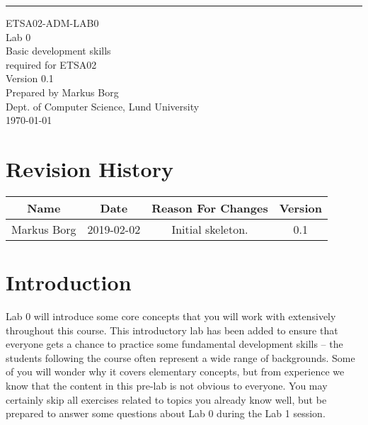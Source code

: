 \documentclass{scrreprt}
\date{}
\def\myversion{0.1 }
\begin{document}
\begin{flushright}
    \rule{16cm}{5pt}\vskip1cm
    \begin{bfseries}
    	\LARGE{ETSA02-ADM-LAB0}\\
    	\vspace{1.5cm}
        \Huge{Lab 0}\\
        \vspace{0.5cm}
        Basic development skills\\
        \vspace{0.5cm}
        required for ETSA02\\
        \vspace{1.5cm}
        \LARGE{Version \myversion}\\
        \vspace{1.5cm}
        Prepared by Markus Borg\\
        Dept. of Computer Science, Lund University\\
        \vspace{1.5cm}
        \today\\
    \end{bfseries}
\end{flushright}


\chapter*{Revision History}

\begin{center}
    \begin{tabular}{|c|c|c|c|}
        \hline
	    Name & Date & Reason For Changes & Version\\
        \hline
	    Markus Borg & 2019-02-02 & Initial skeleton. & 0.1\\
        \hline
    \end{tabular}
\end{center}

\chapter{Introduction}
Lab 0 will introduce some core concepts that you will work with extensively throughout this course. This introductory lab has been added to ensure that everyone gets a chance to practice some fundamental development skills -- the students following the course often represent a wide range of backgrounds. Some of you will wonder why it covers elementary concepts, but from experience we know that the content in this pre-lab is not obvious to everyone. You may certainly skip all exercises related to topics you already know well, but be prepared to answer some questions about Lab 0 during the Lab 1 session.
\end{document}
